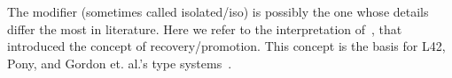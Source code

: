 






The \Q@capsule@ modifier (sometimes called isolated/iso) is possibly the one whose details differ the most in literature. Here we refer to the interpretation of~\cite{GordonEtAl12}, that introduced the concept of recovery/promotion.
This concept is the basis for L42, Pony, and Gordon et. al.'s type systems~\cite{GordonEtAl12,ServettoEtAl13a,ServettoZucca15,ServettoEtAl13a,clebsch2015deny,clebsch2017orca}. 


